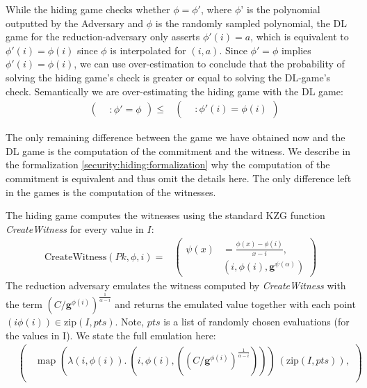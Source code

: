 While the hiding game checks whether $\phi=\phi'$, where $\phi$' is the polynomial outputted by the Adversary and  $\phi$ is the randomly sampled polynomial, the DL game for the reduction-adversary only asserts $\phi'(i)=a$, which is equivalent to $\phi'(i)=\phi(i)$ since $\phi$ is interpolated for $(i, a)$. Since $\phi'=\phi$ implies $\phi'(i)=\phi(i)$, we can use over-estimation to conclude that the probability of solving the hiding game's check is greater or equal to solving the DL-game's check. Semantically we are over-estimating the hiding game with the DL game: 
\begin{equation*}
    \begin{aligned}
        &\left(
            \begin{aligned}
                &: \phi'=\phi
            \end{aligned}
        \right)
        \le&\left(
            \begin{aligned}
                &: \phi'(i)=\phi(i)
            \end{aligned}
        \right)
    \end{aligned}
\end{equation*}

The only remaining difference between the game we have obtained now and the DL game is the computation of the commitment and the witness. We describe in the formalization \ref{security:hiding:formalization} why the computation of the commitment is equivalent and thus omit the details here. 
The only difference left in the games is the computation of the witnesses. 

The hiding game computes the witnesses using the standard KZG function \textit{CreateWitness} for every value in $I$:  
\begin{equation*}
    \begin{aligned}
        \text{CreateWitness}(Pk,\phi,i)=&\left(
            \begin{aligned}
                \psi(x) &= \frac{\phi(x)-\phi(i)}{x-i}, \\
                & (i,\phi(i), \mathbf{g}^{\psi(\alpha)})
            \end{aligned}
        \right)
    \end{aligned}
\end{equation*}
The reduction adversary emulates the witness computed by \textit{CreateWitness} with the term $(C/\mathbf{g}^{\phi(i)})^{\frac{1}{\alpha-i}}$ and returns the emulated value together with each point $(i\phi(i))\in \text{zip}(I,pts)$. Note, $pts$ is a list of randomly chosen evaluations (for the values in I). We state the full emulation here:
\begin{equation*}
    \begin{aligned}
        &\left(
            \begin{aligned}
                &\text{map } (\lambda (i,\phi(i)).\ (i,\phi(i), ((C/\mathbf{g}^{\phi(i)})^{\frac{1}{\alpha-i}})))\ (\text{zip}(I,pts)),\\
            \end{aligned}
        \right)
    \end{aligned}
\end{equation*}

